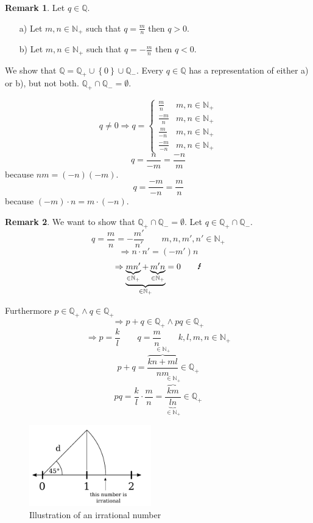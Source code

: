 \documentclass[a4paper,landscape,twocolumn]{article}
\theoremstyle{definition}
\newtheorem{rem}{Remark}
\newcommand\set[1]{\left\{#1\right\}}
\begin{document}
\begin{rem}
  Let $q \in \mathbb{Q}$.
  \begin{itemize}
    \item[a)] Let $m,n \in \mathbb{N}_+$ such that $q = \frac mn$ then $q > 0$.
    \item[b)] Let $m,n \in \mathbb{N}_+$ such that $q = -\frac mn$ then $q < 0$.
  \end{itemize}

  We show that $\mathbb{Q} = \mathbb{Q}_+ \cup \set{0} \cup \mathbb{Q}_-$.
  Every $q \in \mathbb{Q}$ has a representation of either a) or b), but not both.
  $\mathbb{Q}_+ \cap \mathbb{Q}_- = \emptyset$.

  \[
    q \neq 0 \Rightarrow q = \begin{cases}
      \frac mn & m,n \in \mathbb{N}_+ \\
      \frac {-m}n & m,n \in \mathbb{N}_+ \\
      \frac m{-n} & m,n \in \mathbb{N}_+ \\
      \frac{-m}{-n} & m,n \in \mathbb{N}_+
    \end{cases}
  \]
  \[ q = \frac{n}{-m} = \frac{-n}{m} \]
  because $nm = (-n)(-m)$.
  \[ q = \frac{-m}{-n} = \frac mn \]
  because $(-m) \cdot n = m \cdot (-n)$.
\end{rem}

\begin{rem}
  We want to show that $\mathbb{Q}_+ \cap \mathbb{Q}_- = \emptyset$.
  Let $q \in \mathbb{Q}_+ \cap \mathbb{Q}_-$.
  \[ q = \frac mn = -\frac{m'}{n'} \qquad m,n,m',n' \in \mathbb{N}_+ \]
  \[ \Rightarrow n \cdot n' = (-m') n \]
  \[ \Rightarrow \underbrace{\underbrace{mn'}_{\in \mathbb{N}_+} + \underbrace{m' n}_{\in \mathbb{N}_+}}_{\in \mathbb{N}_+} = 0 \qquad\text{\Lightning} \]

  Furthermore $p \in \mathbb{Q}_+ \land q \in \mathbb{Q}_+$
  \[ \Rightarrow p + q \in \mathbb{Q}_+ \land pq \in \mathbb{Q}_+ \]
  \[ \Rightarrow p = \frac kl \qquad q = \frac mn \qquad k,l,m,n \in \mathbb{N}_+ \]
  \[ p + q = \frac{\overbrace{kn + ml}^{\in \mathbb{N}_+}}{nm} \in \mathbb{Q}_+ \]
  \[ pq = \frac{k}{l} \cdot \frac mn = \frac{\overbrace{km}^{\in \mathbb{N}_+}}{\underbrace{ln}_{\in \mathbb{N}_+}} \in \mathbb{Q}_+ \]
\end{rem}

\begin{figure}[!h]
  \begin{center}
    \includegraphics[width=200px]{img/irrational_number.pdf}
    \caption{Illustration of an irrational number}
  \end{center}
\end{figure}
\end{document}
